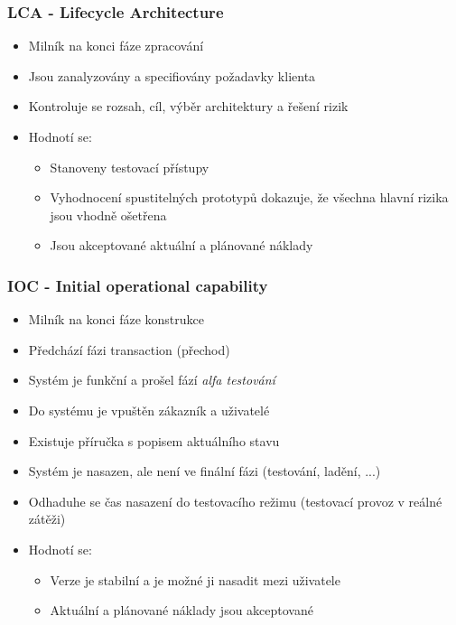       \subsubsection{LCA - Lifecycle Architecture}
        \begin{itemize}
          \item Milník na konci fáze zpracování
          \item Jsou zanalyzovány a specifiovány požadavky klienta
          \item Kontroluje se rozsah, cíl, výběr architektury a řešení rizik
          \item Hodnotí se:
            \begin{itemize}
              \item Stanoveny testovací přístupy
              \item Vyhodnocení spustitelných prototypů dokazuje, že všechna hlavní rizika jsou vhodně ošetřena
              \item Jsou akceptované aktuální a plánované náklady
            \end{itemize}
        \end{itemize}

      \subsubsection{IOC - Initial operational capability}
        \begin{itemize}
          \item Milník na konci fáze konstrukce
          \item Předchází fázi transaction (přechod)
          \item Systém je funkční a prošel fází \emph{alfa testování}
          \item Do systému je vpuštěn zákazník a uživatelé
          \item Existuje příručka s popisem aktuálního stavu
          \item Systém je nasazen, ale není ve finální fázi (testování, ladění, ...)
          \item Odhaduhe se čas nasazení do testovacího režimu (testovací provoz v reálné zátěži)
          \item Hodnotí se:
            \begin{itemize}
              \item Verze je stabilní a je možné ji nasadit mezi uživatele
              \item Aktuální a plánované náklady jsou akceptované
            \end{itemize}
        \end{itemize}

